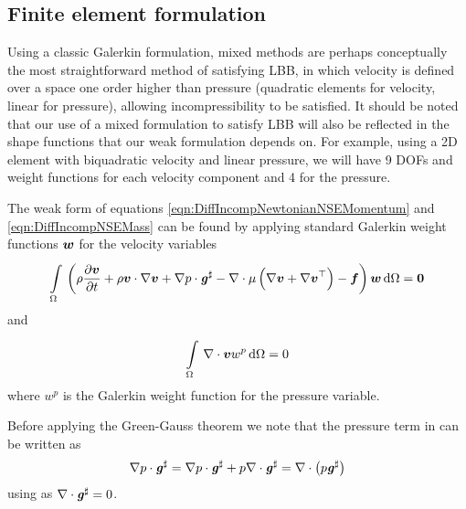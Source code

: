 \subsection{Finite element formulation}

Using a classic Galerkin formulation, mixed methods are perhaps conceptually
the most straightforward method of satisfying LBB, in which velocity is
defined over a space one order higher than pressure (\eg quadratic elements
for velocity, linear for pressure), allowing incompressibility to be
satisfied. It should be noted that our use of a mixed formulation to satisfy
LBB will also be reflected in the shape functions that our weak formulation
depends on. For example, using a 2D element with biquadratic velocity and
linear pressure, we will have 9 DOFs and weight functions for each velocity
component and 4 for the pressure.

The weak form of equations \ref{eqn:DiffIncompNewtonianNSEMomentum} and
\ref{eqn:DiffIncompNSEMass} can be found by applying standard Galerkin weight
functions $ \boldsymbol{w} $ for the velocity variables \ie
\begin{equation}
  \gint{\Omega}{}{\pbrac{\rho\delby{\vectr{v}}{t}+\dotprod{\rho\vectr{v}}{\gradient{}{\vectr{v}}}
      +\dotprod{\gradient{}{p}}{\sharptensor{\tensor{g}}}
      -\divergence{}{\mu\pbrac{\gradient{}{\vectr{v}+\transpose{\gradient{}{\vectr{v}}}}}}
      -\vectr{f}}{\vectr{w}}}{\Omega} = \vectr{0}
 \label{eqn:BasicGalerkinNSEMomentum}
\end{equation}
and
\begin{equation}
  \gint{\Omega}{}{\divergence{}{\vectr{v}}w^{p}}{\Omega} = 0
 \label{eqn:BasicGalerkinNSEMass}
\end{equation}
where $w^{p}$ is the Galerkin weight function for the pressure variable.

Before applying the Green-Gauss theorem we note that the pressure term in
 can be written as
\begin{equation}
  \dotprod{\gradient{}{p}}{\sharptensor{\tensor{g}}}=\dotprod{\gradient{}{p}}{\sharptensor{\tensor{g}}}+p\divergence{}{\sharptensor{\tensor{g}}}=\divergence{}{\pbrac{p\sharptensor{\tensor{g}}}}
\end{equation}
using  as
$\divergence{}{\sharptensor{\tensor{g}}}=0$.

